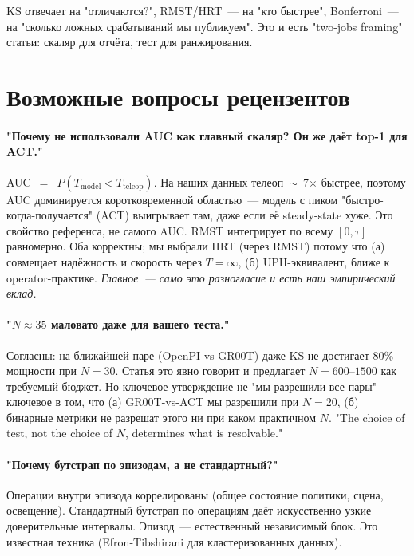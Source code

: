 \documentclass[11pt]{article}
\begin{document}
KS отвечает на "отличаются?", RMST/HRT~--- на "кто быстрее", Bonferroni~--- на "сколько ложных срабатываний мы публикуем". Это и есть "two-jobs framing" статьи: скаляр для отчёта, тест для ранжирования.

\section{Возможные вопросы рецензентов}

\paragraph{"Почему не использовали AUC как главный скаляр? Он же даёт top-1 для ACT."} AUC~$=$~$P(T_{\text{model}} < T_{\text{teleop}})$. На наших данных телеоп~$\sim$~7$\times$ быстрее, поэтому AUC доминируется коротковременной областью~--- модель с пиком "быстро-когда-получается" (ACT) выигрывает там, даже если её steady-state хуже. Это свойство референса, не самого AUC. RMST интегрирует по всему $[0,\tau]$ равномерно. Оба корректны; мы выбрали HRT (через RMST) потому что (а) совмещает надёжность и скорость через $T=\infty$, (б) UPH-эквивалент, ближе к operator-практике. \emph{Главное~--- само это разногласие и есть наш эмпирический вклад.}

\paragraph{"$N \approx 35$ маловато даже для вашего теста."} Согласны: на ближайшей паре (OpenPI vs GR00T) даже KS не достигает 80\% мощности при $N=30$. Статья это явно говорит и предлагает $N=600$--$1500$ как требуемый бюджет. Но ключевое утверждение не "мы разрешили все пары"~--- ключевое в том, что (а) GR00T-vs-ACT мы разрешили при $N=20$, (б) бинарные метрики не разрешат этого ни при каком практичном $N$. "The choice of test, not the choice of $N$, determines what is resolvable."

\paragraph{"Почему бутстрап по эпизодам, а не стандартный?"} Операции внутри эпизода коррелированы (общее состояние политики, сцена, освещение). Стандартный бутстрап по операциям даёт искусственно узкие доверительные интервалы. Эпизод~--- естественный независимый блок. Это известная техника (Efron-Tibshirani для кластеризованных данных).
\end{document}
